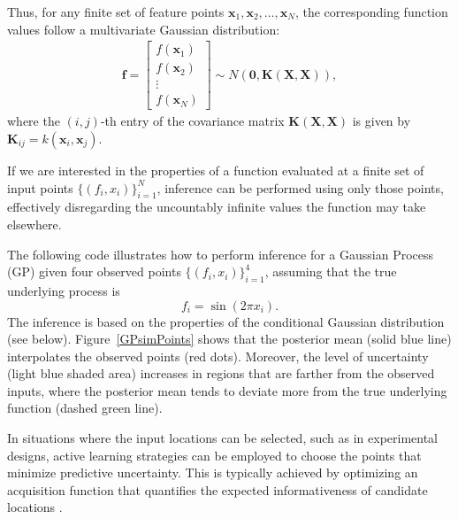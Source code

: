 Thus, for any finite set of feature points \( \mathbf{x}_1, \mathbf{x}_2, \dots, \mathbf{x}_N \), the corresponding function values follow a multivariate Gaussian distribution:
\begin{align*}
	\mathbf{f} =
	\begin{bmatrix}
		f(\mathbf{x}_1) \\
		f(\mathbf{x}_2) \\
		\vdots \\
		f(\mathbf{x}_N)
	\end{bmatrix}
	\sim N(\mathbf{0}, \mathbf{K}(\mathbf{X}, \mathbf{X})),
\end{align*}
where the \( (i,j) \)-th entry of the covariance matrix \( \mathbf{K}(\mathbf{X}, \mathbf{X}) \) is given by \( \mathbf{K}_{ij} = k(\mathbf{x}_i, \mathbf{x}_j) \).

If we are interested in the properties of a function evaluated at a finite set of input points \( \{(f_i, x_i)\}_{i=1}^N\), inference can be performed using only those points, effectively disregarding the uncountably infinite values the function may take elsewhere.

The following code illustrates how to perform inference for a Gaussian Process (GP) given four observed points \( \{(f_i, x_i)\}_{i=1}^4 \), assuming that the true underlying process is
\[
f_i = \sin(2\pi x_i).
\]
The inference is based on the properties of the conditional Gaussian distribution (see below). Figure~\ref{GPsimPoints} shows that the posterior mean (solid blue line) interpolates the observed points (red dots). Moreover, the level of uncertainty (light blue shaded area) increases in regions that are farther from the observed inputs, where the posterior mean tends to deviate more from the true underlying function (dashed green line).

In situations where the input locations can be selected, such as in experimental designs, active learning strategies can be employed to choose the points that minimize predictive uncertainty. This is typically achieved by optimizing an acquisition function that quantifies the expected informativeness of candidate locations \cite{settles2012active}.

